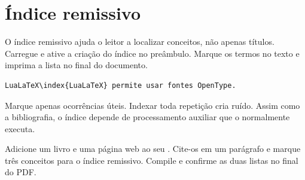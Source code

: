 \section{Índice remissivo}

O índice remissivo ajuda o leitor a localizar conceitos, não apenas títulos.
Carregue  e ative a criação do índice no preâmbulo. Marque os
termos no texto e imprima a lista no final do documento.

\begin{lstlisting}[language=LaTeXBook]
LuaLaTeX\index{LuaLaTeX} permite usar fontes OpenType.
\end{lstlisting}

Marque apenas ocorrências úteis. Indexar toda repetição cria ruído. Assim como a
bibliografia, o índice depende de processamento auxiliar que o 
normalmente executa.

\begin{pratica}
  Adicione um livro e uma página web ao seu . Cite-os
  em um parágrafo e marque três conceitos para o índice remissivo. Compile e
  confirme as duas listas no final do PDF.
\end{pratica}
